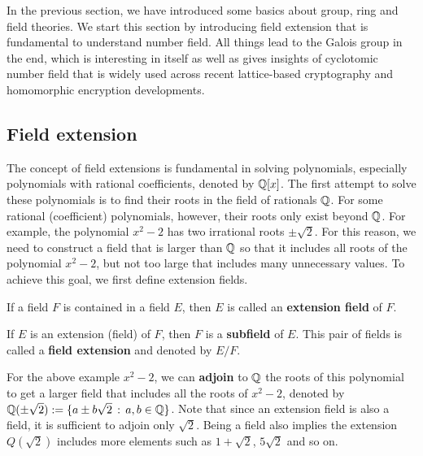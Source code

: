 \documentclass[../main.tex]{subfiles}
\begin{document}
\label{appen:galois theory}

In the previous section, we have introduced some basics about group, ring and field theories. We start this section by introducing field extension that is fundamental to understand number field. All things lead to the Galois group in the end, which is interesting in itself as well as gives insights of cyclotomic number field that is widely used across recent lattice-based cryptography and homomorphic encryption developments.  


\subsection{Field extension}
\label{subsection:field extension}
The concept of field extensions is fundamental in solving polynomials, especially polynomials with rational coefficients, denoted by $\mathbb{Q}[x]$. The first attempt to solve these polynomials is to find  their roots in the field of rationals $\mathbb{Q}$. For some rational (coefficient) polynomials, however, their roots only exist beyond $\mathbb{Q}$. For example, the polynomial $x^2-2$ has two irrational roots $\pm \sqrt{2}$. For this reason, we need to construct a field that is larger than $\mathbb{Q}$ so that it includes all roots of the polynomial $x^2-2$, but not too large that includes many unnecessary values. To achieve this goal, we first define extension fields.      

\begin{definition}
If a field $F$ is contained in a field $E$, then $E$ is called an \textbf{extension field} of $F$. 
\end{definition}
If $E$ is an extension (field) of $F$, then $F$ is a \textbf{subfield} of $E$. This pair of fields is called a \textbf{field extension} and denoted by $E/F$.\reversemarginpar
{}

For the above example $x^2-2$, we can \textbf{adjoin} to $\mathbb{Q}$ the roots of this polynomial  to get a  larger field that includes all the roots of $x^2-2$, denoted by $\mathbb{Q}(\pm \sqrt{2}) := \{ a \pm b\sqrt{2} \,:\, a,b \in \mathbb{Q}\}$. Note that since an extension field is also a field, it is sufficient to adjoin only $\sqrt{2}$. Being a field also implies the extension $Q(\sqrt{2})$ includes more elements such as $1+\sqrt{2}$, $5\sqrt{2}$ and so on. 
\end{document}
